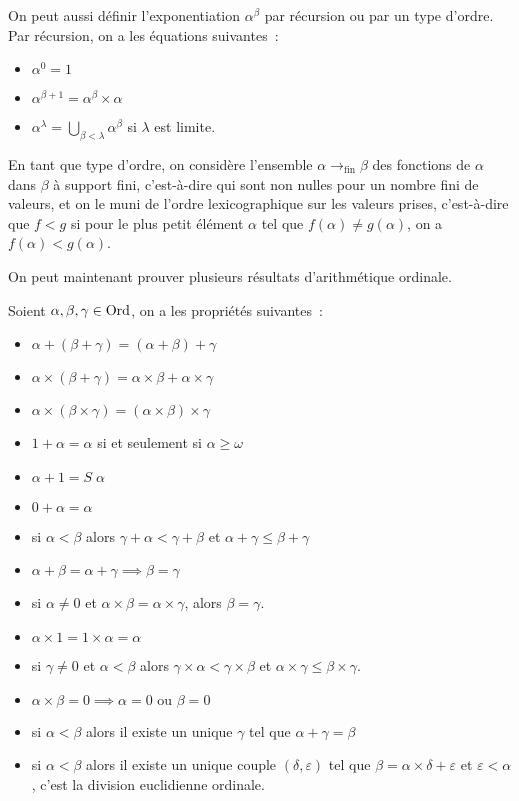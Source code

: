 On peut aussi définir l'exponentiation $\alpha^\beta$ par récursion ou par un
type d'ordre. Par récursion, on a les équations suivantes~:
\begin{itemize}
\item $\alpha^0 = 1$
\item $\alpha^{\beta+1} = \alpha^\beta \times \alpha$
\item $\alpha^\lambda = \displaystyle\bigcup_{\beta < \lambda}\alpha^\beta$
  si $\lambda$ est limite.
\end{itemize}
En tant que type d'ordre, on considère l'ensemble $\alpha\to_\mathrm{fin}\beta$
des fonctions de $\alpha$ dans $\beta$ à support fini, c'est-à-dire qui sont non
nulles pour un nombre fini de valeurs, et on le muni de l'ordre lexicographique
sur les valeurs prises, c'est-à-dire que $f < g$ si pour le plus petit élément
$\alpha$ tel que $f(\alpha)\neq g(\alpha)$, on a $f(\alpha) < g(\alpha)$.

On peut maintenant prouver plusieurs résultats d'arithmétique ordinale.

\begin{property}
  Soient $\alpha,\beta,\gamma\in\operatorname{Ord}$, on a les propriétés suivantes~:
  \begin{itemize}
  \item $\alpha + (\beta + \gamma) = (\alpha + \beta) + \gamma$
  \item $\alpha\times(\beta+\gamma) = \alpha\times\beta+\alpha\times\gamma$
  \item $\alpha\times(\beta\times\gamma) = (\alpha\times\beta)\times \gamma$
  \item $1 + \alpha = \alpha$ si et seulement si $\alpha \geq \omega$
  \item $\alpha + 1 = S\;\alpha$
  \item $0 + \alpha = \alpha$
  \item si $\alpha < \beta$ alors $\gamma + \alpha < \gamma + \beta$ et
    $\alpha + \gamma \leq \beta + \gamma$
  \item $\alpha + \beta = \alpha + \gamma \implies \beta = \gamma$
  \item si $\alpha \neq 0$ et $\alpha \times \beta = \alpha \times \gamma$,
    alors $\beta = \gamma$.
  \item $\alpha \times 1 = 1 \times \alpha = \alpha$
  \item si $\gamma \neq 0$ et $\alpha < \beta$ alors
    $\gamma \times \alpha < \gamma \times \beta$ et
    $\alpha\times\gamma\leq\beta\times\gamma$.
  \item $\alpha\times\beta = 0 \implies \alpha = 0 \text{ ou }\beta=0$
  \item si $\alpha < \beta$ alors il existe un unique $\gamma$ tel que
    $\alpha + \gamma = \beta$
  \item si $\alpha < \beta$ alors il existe un unique couple
    $(\delta,\varepsilon)$ tel que $\beta = \alpha \times\delta + \varepsilon$
    et $\varepsilon < \alpha$, c'est la division euclidienne ordinale.
  \end{itemize}
\end{property}

